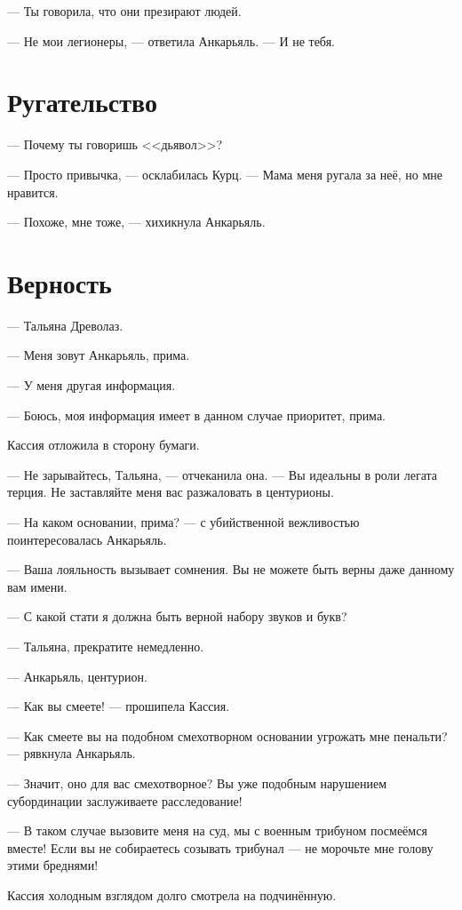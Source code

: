 \documentclass[a4paper,10pt,fleqn]{book}\usepackage{polyglossia}\setdefaultlanguage{english}\setotherlanguage{russian}\defaultfontfeatures{Ligatures=TeX,Mapping=tex-text}\usepackage{xcolor}\definecolor{lightgray}{HTML}{bbbbbb}\color{lightgray}\newcommand{\ml}[3]{\textcolor{black}{#3}}
\begin{document}
--- Ты говорила, что они презирают людей.

--- Не мои легионеры, --- ответила Анкарьяль.
--- И не тебя.

\section{Ругательство}

--- Почему ты говоришь <<дьявол>>?

--- Просто привычка, --- осклабилась Курц.
--- Мама меня ругала за неё, но мне нравится.

--- Похоже, мне тоже, --- хихикнула Анкарьяль.

\section{Верность}

--- Тальяна Древолаз.

--- Меня зовут Анкарьяль, прима.

--- У меня другая информация.

--- Боюсь, моя информация имеет в данном случае приоритет, прима.

Кассия отложила в сторону бумаги.

--- Не зарывайтесь, Тальяна, --- отчеканила она.
--- Вы идеальны в роли легата терция.
Не заставляйте меня вас разжаловать в центурионы.

--- На каком основании, прима? --- с убийственной вежливостью поинтересовалась Анкарьяль.

--- Ваша лояльность вызывает сомнения.
Вы не можете быть верны даже данному вам имени.

--- С какой стати я должна быть верной набору звуков и букв?

--- Тальяна, прекратите немедленно.

--- Анкарьяль, центурион.

--- Как вы смеете! --- прошипела Кассия.

--- Как смеете вы на подобном смехотворном основании угрожать мне пенальти? --- рявкнула Анкарьяль.

--- Значит, оно для вас смехотворное?
Вы уже подобным нарушением субординации заслуживаете расследование!

--- В таком случае вызовите меня на суд, мы с военным трибуном посмеёмся вместе!
Если вы не собираетесь созывать трибунал --- не морочьте мне голову этими бреднями!

Кассия холодным взглядом долго смотрела на подчинённую.
\end{document}
